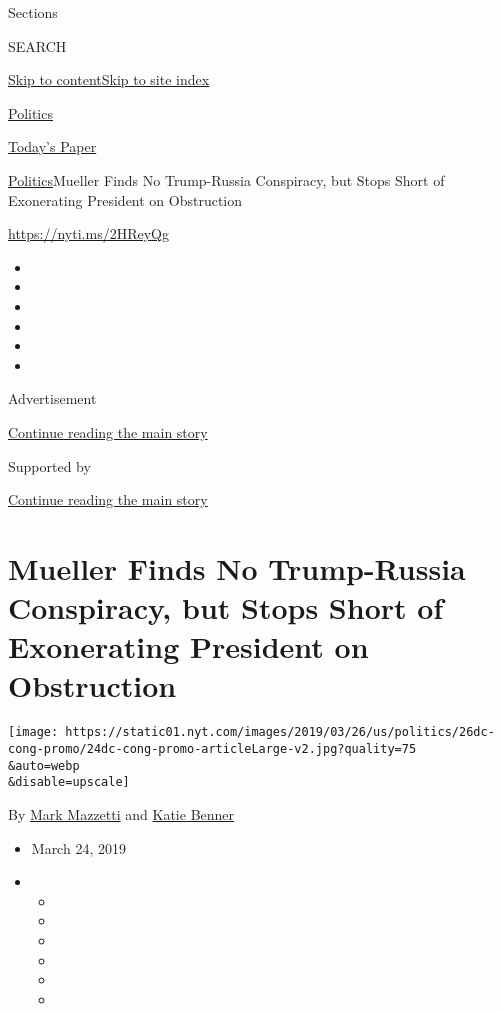 Sections

SEARCH

\protect\hyperlink{site-content}{Skip to
content}\protect\hyperlink{site-index}{Skip to site index}

\href{https://www.nytimes.com/section/politics}{Politics}

\href{https://myaccount.nytimes.com/auth/login?response_type=cookie\&client_id=vi}{}

\href{https://www.nytimes.com/section/todayspaper}{Today's Paper}

\href{/section/politics}{Politics}\textbar{}Mueller Finds No
Trump-Russia Conspiracy, but Stops Short of Exonerating President on
Obstruction

\url{https://nyti.ms/2HReyQg}

\begin{itemize}
\item
\item
\item
\item
\item
\item
\end{itemize}

Advertisement

\protect\hyperlink{after-top}{Continue reading the main story}

Supported by

\protect\hyperlink{after-sponsor}{Continue reading the main story}

\hypertarget{mueller-finds-no-trump-russia-conspiracy-but-stops-short-of-exonerating-president-on-obstruction}{%
\section{Mueller Finds No Trump-Russia Conspiracy, but Stops Short of
Exonerating President on
Obstruction}\label{mueller-finds-no-trump-russia-conspiracy-but-stops-short-of-exonerating-president-on-obstruction}}

\texttt{[image: https://static01.nyt.com/images/2019/03/26/us/politics/26dc-cong-promo/24dc-cong-promo-articleLarge-v2.jpg?quality=75\\\&auto=webp\\\&disable=upscale]}

By \href{https://www.nytimes.com/by/mark-mazzetti}{Mark Mazzetti} and
\href{https://www.nytimes.com/by/katie-benner}{Katie Benner}

\begin{itemize}
\item
  March 24, 2019
\item
  \begin{itemize}
  \item
  \item
  \item
  \item
  \item
  \item
  \end{itemize}
\end{itemize}

